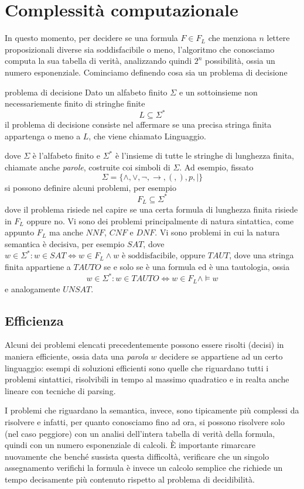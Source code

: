 \section{Complessità computazionale}
In questo momento, per decidere se una formula $F \in F_L$ che menziona $n$ lettere 
proposizionali diverse sia soddisfacibile o meno, l'algoritmo che conosciamo
computa la sua tabella di verità, analizzando quindi $2^n$ possibilità, ossia 
un numero esponenziale. Cominciamo definendo cosa sia un problema di 
decisione
\begin{defi}{problema di decisione}
 Dato un alfabeto finito $\Sigma$ e un sottoinsieme non necessariemente 
 finito di stringhe finite  
  $$
 L \subseteq \Sigma^* 
 $$
 il problema di decisione consiste nel affermare se una precisa 
 stringa finita appartenga o meno a $L$, che viene chiamato Linguaggio. 
\end{defi}
dove $\Sigma$ è l'alfabeto finito e $\Sigma^*$ è l'insieme di tutte le 
stringhe di lunghezza finita, chiamate anche \textit{parole}, costruite 
coi simboli di $\Sigma$. 
Ad esempio, fissato 
$$
\Sigma = \{\land, \lor, \neg, \rightarrow, (, ), p, |\}
$$
si possono definire alcuni problemi, per esempio
$$
F_L \subseteq \Sigma ^*
$$
dove il problema risiede nel capire se una certa formula di lunghezza finita
risiede in $F_L$ oppure no. 
Vi sono dei problemi principalmente di natura sintattica, come appunto $F_L$ 
ma anche $NNF$, $CNF$ e $DNF$. Vi sono problemi in cui la natura semantica 
è decisiva, per esempio $SAT$, dove 
$w \in \Sigma^* : w\in SAT \iff w \in F_L \land w \text{ è soddisfacibile}$, 
oppure $TAUT$, dove una stringa finita appartiene a $TAUTO$ se e solo se 
è una formula ed è una tautologia, ossia
$$
w \in \Sigma^* : w \in TAUTO \iff w \in F_L \land \models w
$$
e analogamente $UNSAT$. 


\subsection{Efficienza}
Alcuni dei problemi elencati precedentemente possono essere risolti (decisi) 
in maniera efficiente, ossia data una \textit{parola} $w$ decidere se 
appartiene ad un certo linguaggio: esempi di soluzioni efficienti sono 
quelle che riguardano tutti i problemi sintattici, risolvibili in tempo 
al massimo quadratico e in realta anche lineare con tecniche di parsing. 

I problemi che riguardano la semantica, invece, sono tipicamente più complessi
da risolvere e infatti, per quanto conosciamo fino ad ora, si possono risolvere 
solo (nel caso peggiore) con un analisi dell'intera tabella di verità della 
formula, quindi con un numero esponenziale di calcoli. \`E importante rimarcare 
nuovamente che benché sussista questa difficoltà, verificare che 
un singolo assegnamento verifichi la formula è invece un calcolo semplice 
che richiede un tempo decisamente più contenuto rispetto al problema di 
decidibilità.

